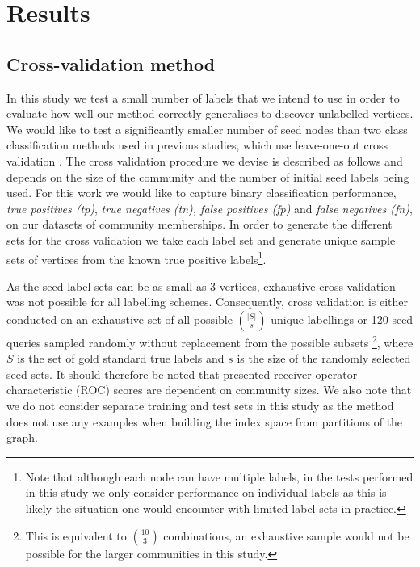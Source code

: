 \documentclass[sigconf]{acmart}
\begin{document}
\section{Results}
\subsection{Cross-validation method}
\label{sec:cross_validation}
In this study we test a small number of labels that we intend to use in order to evaluate how well our method correctly generalises to discover unlabelled vertices.
We would like to test a significantly smaller number of seed nodes than two class classification methods used in previous studies, which use leave-one-out cross validation \cite{kohler2008walking}.
The cross validation procedure we devise is described as follows and depends on the size of the community and the number of initial seed labels being used.
For this work we would like to capture binary classification  performance, \textit{true positives (tp)}, \textit{true negatives (tn), false positives (fp)} and \textit{false negatives (fn)}, on our datasets of community memberships.
In order to generate the different sets for the cross validation we take each label set and generate unique sample sets of vertices from the known true positive labels\footnote{Note that although each node can have multiple labels, in the tests performed in this study we only consider performance on individual labels as this is likely the situation one would encounter with limited label sets in practice.}.

As the seed label sets can be as small as 3 vertices, exhaustive cross validation was not possible for all labelling schemes.
Consequently, cross validation is either conducted on an exhaustive set of all possible $\binom{|S|}{s}$ unique labellings or 120 seed queries sampled randomly without replacement from the possible subsets \footnote{This is equivalent to $\binom{10}{3}$ combinations, an exhaustive sample would not be possible for the larger communities in this study.}, where $S$ is the set of gold standard true labels and $s$ is the size of the randomly selected seed sets.
It should therefore be noted that presented receiver operator characteristic (ROC) scores are dependent on community sizes.
We also note that we do not consider separate training and test sets in this study as the method does not use any examples when building the index space from partitions of the graph.
\end{document}
